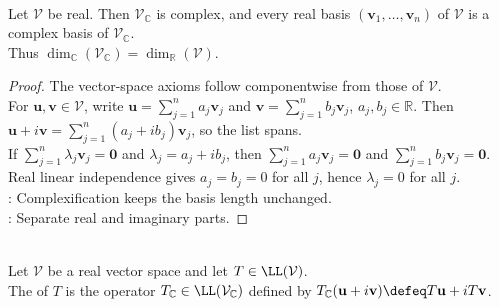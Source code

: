 \begin{proposition} \label{prop:complexification-vector-space-basis} \\
Let $\mathcal{V}$ be real. Then $\mathcal{V}_{\mathbb{C}}$ is complex, and every real basis $(\mathbf{v}_1,\ldots,\mathbf{v}_n)$ of $\mathcal{V}$ is a complex basis of $\mathcal{V}_{\mathbb{C}}$.\\
Thus $\dim_{\mathbb{C}}(\mathcal{V}_{\mathbb{C}})=\dim_{\mathbb{R}}(\mathcal{V})$.
\begin{proof}
The vector-space axioms follow componentwise from those of $\mathcal{V}$.\\
For $\mathbf{u},\mathbf{v}\in\mathcal{V}$, write $\mathbf{u}=\sum\limits_{j=1}^{n}a_j\mathbf{v}_j$ and $\mathbf{v}=\sum\limits_{j=1}^{n}b_j\mathbf{v}_j$, $a_j,b_j\in\mathbb{R}$. Then $\mathbf{u}+i\mathbf{v}=\sum\limits_{j=1}^{n}(a_j+ib_j)\mathbf{v}_j$, so the list spans.\\
If $\sum\limits_{j=1}^{n}\lambda_j\mathbf{v}_j=\mathbf{0}$ and $\lambda_j=a_j+ib_j$, then $\sum\limits_{j=1}^{n}a_j\mathbf{v}_j=\mathbf{0}$ and $\sum\limits_{j=1}^{n}b_j\mathbf{v}_j=\mathbf{0}$.\\
Real linear independence gives $a_j=b_j=0$ for all $j$, hence $\lambda_j=0$ for all $j$.\\
: Complexification keeps the basis length unchanged.\\
: Separate real and imaginary parts.
\end{proof}
\end{proposition}

\begin{definition} \label{def:complexification-real-operator} \\
Let $\mathcal{V}$ be a real vector space and let $T\in\LL(\mathcal{V})$.\\
The  of $T$ is the operator $T_{\mathbb{C}}\in\LL(\mathcal{V}_{\mathbb{C}})$ defined by $T_{\mathbb{C}}(\mathbf{u}+i\mathbf{v})\defeq T\mathbf{u}+iT\mathbf{v}$.
\end{definition}

